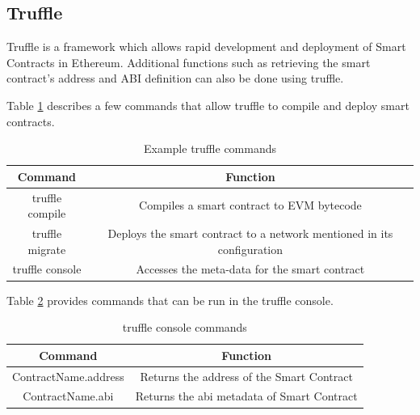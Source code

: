 \documentclass[11pt,openright]{report}
\begin{document}
\subsection{Truffle}
Truffle is a framework which allows rapid development and deployment of Smart Contracts in Ethereum. Additional functions such as retrieving the smart contract's address and ABI definition can also be done using truffle.

Table \ref{truffle_commands} describes a few commands that allow truffle to compile and deploy smart contracts.
\newline
\newline
\begin{table}[!htbp]
    \renewcommand{\arraystretch}{1.3}
    \caption{Example truffle commands}
    \label{truffle_commands}
    \centering
    \begin{tabular}{|c|c|}
        \hline
        \bfseries Command & \bfseries Function \\
        \hline\hline
        truffle compile & Compiles a smart contract to EVM bytecode \\ \hline
        truffle migrate & Deploys the smart contract to a network mentioned in its configuration \\ \hline
        truffle console & Accesses the meta-data for the smart contract \\ \hline
    \end{tabular}
\end{table}
\newline
\newline
Table \ref{truffle_console} provides commands that can be run in the truffle console.
\newline
\newline
\begin{table}[!htbp]
    \renewcommand{\arraystretch}{1.3}
    \caption{truffle console commands}
    \label{truffle_console}
    \centering
    \begin{tabular}{|c|c|}
        \hline
        \bfseries Command & \bfseries Function \\
        \hline\hline
        ContractName.address & Returns the address of the Smart Contract \\ \hline
        ContractName.abi & Returns the abi metadata of Smart Contract \\ \hline
    \end{tabular}
\end{table}
\newline
\newline
\end{document}
